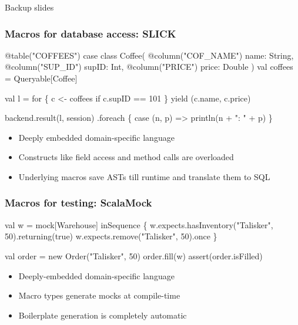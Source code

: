 \documentclass[hyperref={bookmarks=false}]{beamer}
\begin{document}
\begin{frame}[fragile]
\vskip50pt
\begin{center}
\large Backup slides
\end{center}
\end{frame}

\begin{frame}[fragile]
\frametitle{Macros for database access: SLICK}
\begin{semiverbatim}
@table("COFFEES") case class Coffee(
  @column("COF_NAME") name: String,
  @column("SUP_ID") supID: Int,
  @column("PRICE") price: Double
)
val coffees = Queryable[Coffee]

val l = for \{ c <- coffees if c.supID == 101 \}
yield (c.name, c.price)

backend.result(l, session)
 .foreach \{ case (n, p) => println(n + ": " + p) \}
\end{semiverbatim}

\begin{itemize}
\item Deeply embedded domain-specific language
\item Constructs like field access and method calls are overloaded
\item Underlying macros save ASTs till runtime and translate them to SQL
\end{itemize}
\end{frame}

\begin{frame}[fragile]
\frametitle{Macros for testing: ScalaMock}
\begin{semiverbatim}
val w = mock[Warehouse]
inSequence \{
  w.expects.hasInventory("Talisker", 50).returning(true)
  w.expects.remove("Talisker", 50).once
\}

val order = new Order("Talisker", 50)
order.fill(w)
assert(order.isFilled)

\end{semiverbatim}

\begin{itemize}
\item Deeply-embedded domain-specific language
\item Macro types generate mocks at compile-time
\item Boilerplate generation is completely automatic
\end{itemize}
\end{frame}
\end{document}
